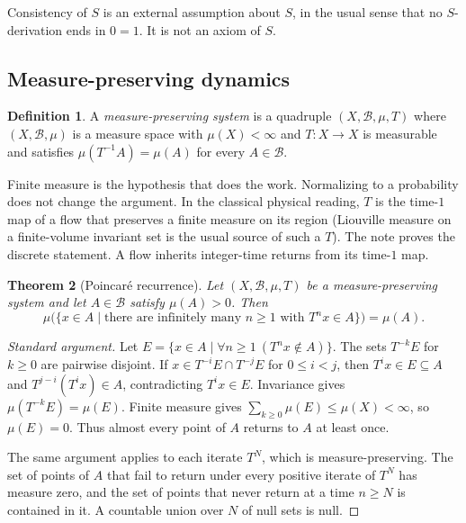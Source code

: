 \documentclass[11pt]{article}
\newtheorem{theorem}{Theorem}
\theoremstyle{definition}
\newtheorem{definition}[theorem]{Definition}
\theoremstyle{remark}
\begin{document}
Consistency of \(S\) is an external assumption about \(S\), in the usual sense that no \(S\)-derivation ends in \(0=1\).
It is not an axiom of \(S\).

\subsection{Measure-preserving dynamics}

\begin{definition}
\label{def:mps}
A \emph{measure-preserving system} is a quadruple \((X,\mathcal{B},\mu,T)\) where \((X,\mathcal{B},\mu)\) is a measure space with \(\mu(X)<\infty\) and \(T\colon X\to X\) is measurable and satisfies \(\mu(T^{-1}A)=\mu(A)\) for every \(A\in\mathcal{B}\).
\end{definition}

Finite measure is the hypothesis that does the work.
Normalizing to a probability does not change the argument.
In the classical physical reading, \(T\) is the time-\(1\) map of a flow that preserves a finite measure on its region (Liouville measure on a finite-volume invariant set is the usual source of such a \(T\)).
The note proves the discrete statement.
A flow inherits integer-time returns from its time-\(1\) map.

\begin{theorem}[Poincar\'e recurrence]
\label{thm:poincare}
Let \((X,\mathcal{B},\mu,T)\) be a measure-preserving system and let \(A\in\mathcal{B}\) satisfy \(\mu(A)>0\).
Then
\[
\mu\bigl(\{x\in A \mid \text{there are infinitely many } n\geq 1 \text{ with } T^{n}x\in A\}\bigr)
= \mu(A).
\]
\end{theorem}

\begin{proof}[Standard argument]
Let \(E=\{x\in A \mid \forall n\geq 1\ (T^{n}x\notin A)\}\).
The sets \(T^{-k}E\) for \(k\geq 0\) are pairwise disjoint.
If \(x\in T^{-i}E\cap T^{-j}E\) for \(0\leq i<j\), then \(T^{i}x\in E\subseteq A\) and \(T^{j-i}(T^{i}x)\in A\), contradicting \(T^{i}x\in E\).
Invariance gives \(\mu(T^{-k}E)=\mu(E)\).
Finite measure gives \(\sum_{k\geq 0}\mu(E)\leq \mu(X)<\infty\), so \(\mu(E)=0\).
Thus almost every point of \(A\) returns to \(A\) at least once.

The same argument applies to each iterate \(T^{N}\), which is measure-preserving.
The set of points of \(A\) that fail to return under every positive iterate of \(T^{N}\) has measure zero, and the set of points that never return at a time \(n\geq N\) is contained in it.
A countable union over \(N\) of null sets is null.
\end{proof}
\end{document}
